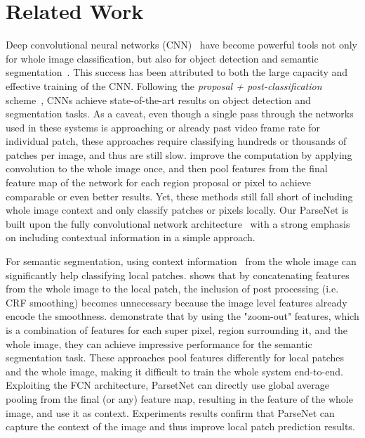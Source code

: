 \documentclass{article} %
\begin{document}
\section{Related Work}
\label{sec:relatedwork}
Deep convolutional neural networks (CNN)~\cite{krizhevsky2012imagenet, szegedy2014going, simonyan2014very} have become powerful tools not only for whole image classification, but also for object detection and semantic segmentation~\cite{girshick2014rich, szegedy2014scalable, gupta2014learning}. This success has been attributed to both the large capacity and effective training of the CNN. Following the \textit{proposal + post-classification} scheme~\cite{uijlings2013selective}, CNNs achieve state-of-the-art results on object detection and segmentation tasks. As a caveat, even though a single pass through the networks used in these systems is approaching or already past video frame rate for individual patch, these approaches require classifying hundreds or thousands of patches per image, and thus are still slow. \cite{he2014spatial, long2014fully} improve the computation by applying convolution to the whole image once, and then pool features from the final feature map of the network for each region proposal or pixel to achieve comparable or even better results. Yet, these methods still fall short of including whole image context and only classify patches or pixels locally. Our ParseNet is built upon the fully convolutional network architecture~\cite{long2014fully} with a strong emphasis on including contextual information in a simple approach.

For semantic segmentation, using context information~\cite{rabinovich2007objects, shotton2009textonboost, torralba2003contextual} from the whole image can significantly help classifying local patches. \cite{lucchi2011spatial} shows that by concatenating features from the whole image to the local patch, the inclusion of post processing (i.e. CRF smoothing) becomes unnecessary because the image level features already encode the smoothness. \cite{mostajabi2014feedforward} demonstrate that by using the "zoom-out" features, which is a combination of features for each super pixel, region surrounding it, and the whole image, they can achieve impressive performance for the semantic segmentation task. These approaches pool features differently for local patches and the whole image, making it difficult to train the whole system end-to-end. Exploiting the FCN architecture, ParsetNet can directly use global average pooling from the final (or any) feature map, resulting in the feature of the whole image, and use it as context. Experiments results confirm that ParseNet can capture the context of the image and thus improve local patch prediction results.
\end{document}
